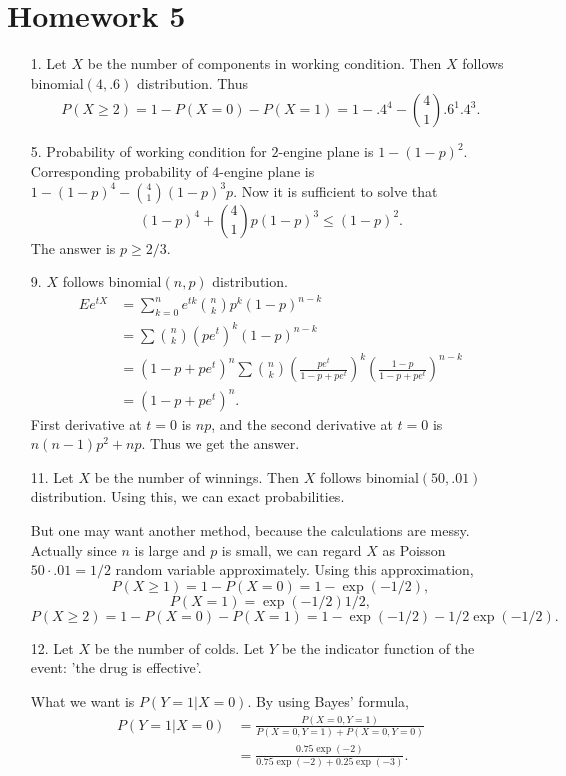 \documentclass{article}
\begin{document}
\section*{Homework 5}
\begin{enumerate}
	\item[1.] Let $X$ be the number of components in working condition.
		Then $X$ follows binomial$(4, .6)$ distribution.
		Thus
		\[
			P(X \ge 2)
			= 1-P(X = 0) - P(X = 1)
			= 1-.4^4 - {4 \choose 1}.6^1 .4^3.
		\]
		
	\item[5.] Probability of working condition for $2$-engine plane is $1-(1-p)^2$.
		Corresponding probability of $4$-engine plane is $1-(1-p)^4 - {4\choose 1}(1-p)^3p$.
		Now it is sufficient to solve that
		\[
			(1-p)^4 + {4\choose 1}p(1-p)^3 \le (1-p)^2.
		\]
		The answer is $p \ge 2/3$.

	\item[9.] $X$ follows binomial$(n, p)$ distribution.
		\[
			\begin{split}
				E e^{tX}
				&= \sum_{k=0}^n e^{tk} {n\choose k} p^k (1-p)^{n-k} \\
				&= \sum {n \choose k} (pe^t)^k (1-p)^{n-k} \\
				&= (1-p+pe^t)^n \sum {n\choose k}\left( \frac{pe^t}{1-p+pe^t} \right)^k\left( \frac{1-p}{1-p+pe^t} \right)^{n-k} \\
				&= (1-p+pe^t)^n.
			\end{split}
		\]
		First derivative at $t = 0$ is $np$, and the second derivative at $t = 0$ is $n(n-1)p^2 +np$.
		Thus we get the answer.

	\item[11.] Let $X$ be the number of winnings.
		Then $X$ follows binomial$(50, .01)$ distribution.
		Using this, we can exact probabilities.

		But one may want another method, because the calculations are messy.
		Actually since $n$ is large and $p$ is small, we can regard $X$ as Poisson $50 \cdot .01 = 1/2$ random variable approximately.
		Using this approximation,
		\[
			P(X \ge 1) = 1-P(X = 0) = 1-\exp(-1/2),
		\]
		\[
			P(X = 1) = \exp(-1/2)1/2,
		\]
		\[
			P(X \ge 2) = 1- P(X = 0) - P(X = 1) = 1- \exp(-1/2) - 1/2 \exp(-1/2).
		\]

	\item[12.] Let $X$ be the number of colds.
		Let $Y$ be the indicator function of the event: 'the drug is effective'.

		What we want is $P(Y = 1 \lvert X = 0)$.
		By using Bayes' formula,
		\[
			\begin{split}
				P(Y = 1 \lvert X = 0) 
				&= \frac{P(X = 0, Y = 1)}{P(X = 0, Y = 1) + P(X = 0, Y = 0)}\\
				&= \frac{0.75 \exp(-2)}{0.75 \exp(-2) + 0.25 \exp(-3)}.
			\end{split}
		\]


\end{enumerate}
\end{document}
